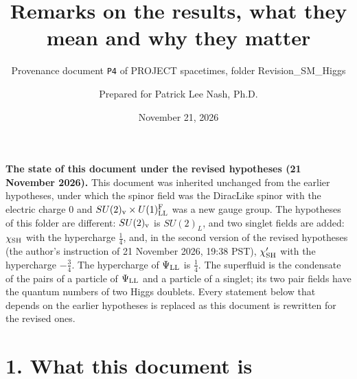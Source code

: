\documentclass[
  10pt,
]{article}
\title{Remarks on the results, what they mean and why they matter}
\subtitle{Provenance document \texttt{P4} of PROJECT spacetimes, folder
Revision\_SM\_Higgs}
\author{Prepared for Patrick Lee Nash, Ph.D.}
\date{November 21, 2026}
\begin{document}
\maketitle

\textbf{The state of this document under the revised hypotheses (21
November 2026).} This document was inherited unchanged from the earlier
hypotheses, under which the spinor field was the DiracLike spinor with
the electric charge 0 and \(SU(2)_{\rm v}\times U(1)^{\rm F}_{\rm LL}\)
was a new gauge group. The hypotheses of this folder are different:
\(SU(2)_{\rm v}\) is \(SU(2)_L\), and two singlet fields are added:
\(\chi_{\rm SH}\) with the hypercharge \(\tfrac14\), and, in the second
version of the revised hypotheses (the author's instruction of 21
November 2026, 19:38 PST), \(\chi'_{\rm SH}\) with the hypercharge
\(-\tfrac34\). The hypercharge of \(\Psi_{\rm LL}\) is \(\tfrac14\). The
superfluid is the condensate of the pairs of a particle of
\(\Psi_{\rm LL}\) and a particle of a singlet; its two pair fields have
the quantum numbers of two Higgs doublets. Every statement below that
depends on the earlier hypotheses is replaced as this document is
rewritten for the revised ones.

\hypertarget{what-this-document-is}{%
\section{1. What this document is}\label{what-this-document-is}}
\end{document}
